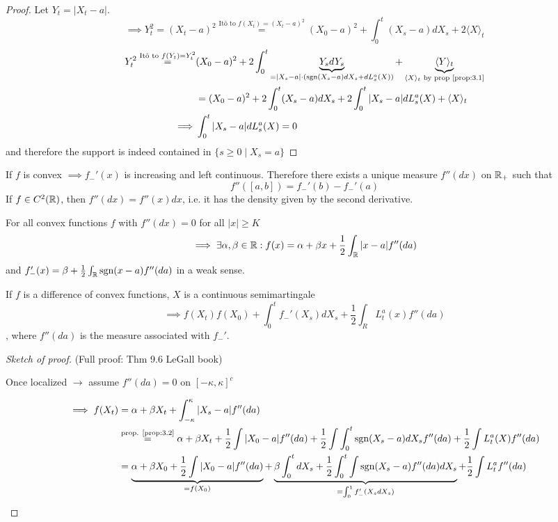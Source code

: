 \begin{proof}
    Let $Y_t=|X_t-a|$.
    \[\implies Y_t^2=(X_t-a)^2\stackrel{\text{Itô to }f(X_t)=(X_t-a)^2}{=}(X_0-a)^2+\int_0^t (X_s-a)dX_s+2\langle X\rangle_t\] 
    \begin{align*}%
        Y_t^2\stackrel{\text{Itô to }f(Y_t)=Y_t^2}{=}&(X_0-a)^2+2\int_0^t \underbrace{Y_s dY_s}_{=|X_s-a|\cdot(\sgn(X_s-a)dX_s+dL_s^a(X))} + \underbrace{\langle Y \rangle_t}_{\langle X\rangle_t\text{ by prop \ref{prop:3.1}}}\\
        &=(X_0-a)^2+2\int_0^t(X_s-a)dX_s+2\int_0^t |X_s-a|dL_s^a(X)+\langle X\rangle_t\\
        \implies&\int_0^t |X_s-a|dL_s^a(X)=0
    \end{align*}
    and therefore the support is indeed contained in $\{s\geq 0\mid X_s=a\}$
\end{proof}

\begin{remark}
    If $f$ is convex $\implies f_-'(x)$ is increasing and left continuous.
    Therefore there exists a unique measure $f''(dx)$ on $\mathbb{R}_+$ such that 
    \[f''([a,b])=f_-'(b)-f_-'(a)\]
    If $f\in C^2(\mathbb{R})$, then $f''(dx)=f''(x)dx$, i.e. it has the density given by the second derivative.

    For all convex functions $f$ with $f''(dx)=0$ for all $|x|\geq K$
    \[\implies \exists \alpha,\beta\in\mathbb{R}: f(x)=\alpha+\beta x+\frac{1}{2}\int_{\mathbb{R}} |x-a|f''(da)\]
    and $f_-'(x)=\beta+\frac{1}{2}\int_{\mathbb{R}}\text{sgn}(x-a)f''(da)$ in a weak sense.
\end{remark}


\begin{theorem}\label{thm:3.4}
    If $f$ is a difference of convex functions, $X$ is a continuous semimartingale
    \[\implies f(X_t)f(X_0)+\int_0^t f_-'(X_s)dX_s +\frac{1}{2}\int_R L_t^a(x)f''(da)\],
    where $f''(da)$ is the measure associated with $f_-'$.
\end{theorem}

\begin{proof}[Sketch of proof]
    (Full proof: Thm 9.6 LeGall book)

    Once localized $\to$ assume $f''(da)=0$ on $[-\kappa,\kappa]^c$

    \begin{align*}
        \implies f(X_t)&=\alpha + \beta X_t+ \int_{-\kappa}^\kappa |X_s-a|f''(da)\\
        & \stackrel{\text{prop. \ref{prop:3.2}}}{=}\alpha +\beta X_t + \frac{1}{2}\int |X_0-a|f''(da)+\frac{1}{2}\int\int_0^t \text{sgn}(X_s-a)dX_s f''(da)+\frac{1}{2}\int L_t^a(X)f''(da)\\
        &=\underbrace{\alpha+\beta X_0+\frac{1}{2}\int |X_0-a|f''(da)}_{=f(X_0)}+\underbrace{\beta\int_0^t dX_s+\frac{1}{2}\int_0^t\int \text{sgn}(X_s-a)f''(da)dX_s}_{=\int_0^1 f_-'(X_sdX_s)}+\frac{1}{2}\int L_t^a f''(da)
    \end{align*}

\end{proof}


